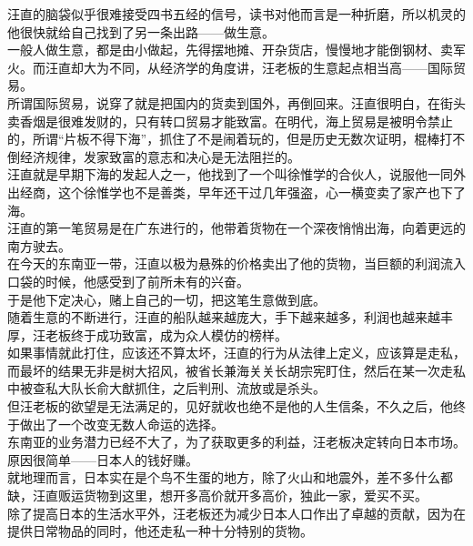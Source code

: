 \begin{multicols}{\theparacolNo}
汪直的脑袋似乎很难接受四书五经的信号，读书对他而言是一种折磨，所以机灵的他很快就给自己找到了另一条出路——做生意。\\

一般人做生意，都是由小做起，先得摆地摊、开杂货店，慢慢地才能倒钢材、卖军火。而汪直却大为不同，从经济学的角度讲，汪老板的生意起点相当高——国际贸易。\\

所谓国际贸易，说穿了就是把国内的货卖到国外，再倒回来。汪直很明白，在街头卖香烟是很难发财的，只有转口贸易才能致富。在明代，海上贸易是被明令禁止的，所谓“片板不得下海”，抓住了不是闹着玩的，但是历史无数次证明，棍棒打不倒经济规律，发家致富的意志和决心是无法阻拦的。\\

汪直就是早期下海的发起人之一，他找到了一个叫徐惟学的合伙人，说服他一同外出经商，这个徐惟学也不是善类，早年还干过几年强盗，心一横变卖了家产也下了海。\\

汪直的第一笔贸易是在广东进行的，他带着货物在一个深夜悄悄出海，向着更远的南方驶去。\\

在今天的东南亚一带，汪直以极为悬殊的价格卖出了他的货物，当巨额的利润流入口袋的时候，他感受到了前所未有的兴奋。\\

于是他下定决心，赌上自己的一切，把这笔生意做到底。\\

随着生意的不断进行，汪直的船队越来越庞大，手下越来越多，利润也越来越丰厚，汪老板终于成功致富，成为众人模仿的榜样。\\

如果事情就此打住，应该还不算太坏，汪直的行为从法律上定义，应该算是走私，而最坏的结果无非是树大招风，被省长兼海关关长胡宗宪盯住，然后在某一次走私中被查私大队长俞大猷抓住，之后判刑、流放或是杀头。\\

但汪老板的欲望是无法满足的，见好就收也绝不是他的人生信条，不久之后，他终于做出了一个改变无数人命运的选择。\\

东南亚的业务潜力已经不大了，为了获取更多的利益，汪老板决定转向日本市场。原因很简单——日本人的钱好赚。\\

就地理而言，日本实在是个鸟不生蛋的地方，除了火山和地震外，差不多什么都缺，汪直贩运货物到这里，想开多高价就开多高价，独此一家，爱买不买。\\

除了提高日本的生活水平外，汪老板还为减少日本人口作出了卓越的贡献，因为在提供日常物品的同时，他还走私一种十分特别的货物。\\


\end{multicols}
